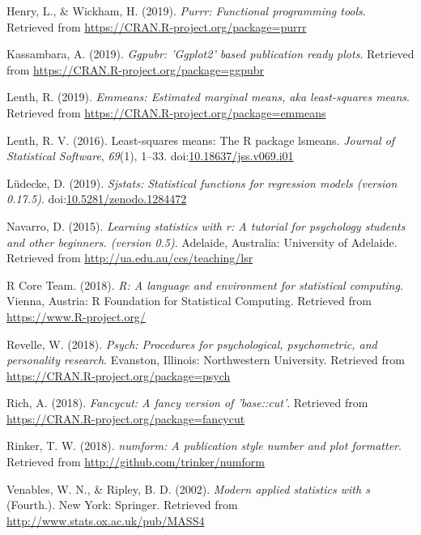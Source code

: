 \documentclass[man]{apa6}
\begin{document}
\hypertarget{ref-R-purrr}{}
Henry, L., \& Wickham, H. (2019). \emph{Purrr: Functional programming
tools}. Retrieved from \url{https://CRAN.R-project.org/package=purrr}

\hypertarget{ref-R-ggpubr}{}
Kassambara, A. (2019). \emph{Ggpubr: 'Ggplot2' based publication ready
plots}. Retrieved from \url{https://CRAN.R-project.org/package=ggpubr}

\hypertarget{ref-R-emmeans}{}
Lenth, R. (2019). \emph{Emmeans: Estimated marginal means, aka
least-squares means}. Retrieved from
\url{https://CRAN.R-project.org/package=emmeans}

\hypertarget{ref-R-lsmeans}{}
Lenth, R. V. (2016). Least-squares means: The R package lsmeans.
\emph{Journal of Statistical Software}, \emph{69}(1), 1--33.
doi:\href{https://doi.org/10.18637/jss.v069.i01}{10.18637/jss.v069.i01}

\hypertarget{ref-R-sjstats}{}
Lüdecke, D. (2019). \emph{Sjstats: Statistical functions for regression
models (version 0.17.5)}.
doi:\href{https://doi.org/10.5281/zenodo.1284472}{10.5281/zenodo.1284472}

\hypertarget{ref-R-lsr}{}
Navarro, D. (2015). \emph{Learning statistics with r: A tutorial for
psychology students and other beginners. (version 0.5)}. Adelaide,
Australia: University of Adelaide. Retrieved from
\url{http://ua.edu.au/ccs/teaching/lsr}

\hypertarget{ref-R-base}{}
R Core Team. (2018). \emph{R: A language and environment for statistical
computing}. Vienna, Austria: R Foundation for Statistical Computing.
Retrieved from \url{https://www.R-project.org/}

\hypertarget{ref-R-psych}{}
Revelle, W. (2018). \emph{Psych: Procedures for psychological,
psychometric, and personality research}. Evanston, Illinois:
Northwestern University. Retrieved from
\url{https://CRAN.R-project.org/package=psych}

\hypertarget{ref-R-fancycut}{}
Rich, A. (2018). \emph{Fancycut: A fancy version of 'base::cut'}.
Retrieved from \url{https://CRAN.R-project.org/package=fancycut}

\hypertarget{ref-R-numform}{}
Rinker, T. W. (2018). \emph{numform: A publication style number and plot
formatter}. Retrieved from \url{http://github.com/trinker/numform}

\hypertarget{ref-R-MASS}{}
Venables, W. N., \& Ripley, B. D. (2002). \emph{Modern applied
statistics with s} (Fourth.). New York: Springer. Retrieved from
\url{http://www.stats.ox.ac.uk/pub/MASS4}
\end{document}
